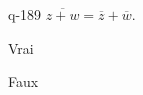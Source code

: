 \begin{truefalse}{q-189}
$\overline{z+w}= \overline z + \overline w$.
\item* Vrai
\item Faux
\end{truefalse}

